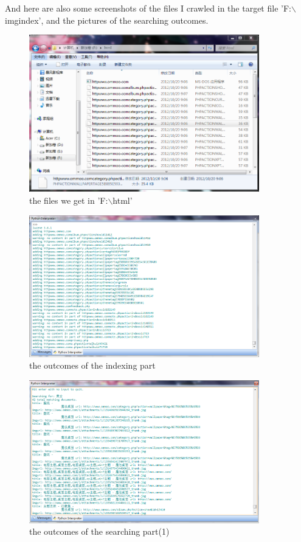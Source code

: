 \documentclass{article}
\begin{document}
And here are also some screenshots of the files I crawled in the target file 'F:$\backslash$imgindex', and the pictures of the searching outcomes.
\begin{figure}[htbp]
\centering
\includegraphics[width=10cm]{24.png}
\caption{the files we get in 'F:$\backslash$html'}
\end{figure}
\begin{figure}[htbp]
\centering
\includegraphics[width=10cm]{25.png}
\caption{the outcomes of the indexing part}
\end{figure}
\begin{figure}[htbp]
\centering
\includegraphics[width=10cm]{26.png}
\caption{the outcomes of the searching part(1)}
\end{figure}
\end{document}
